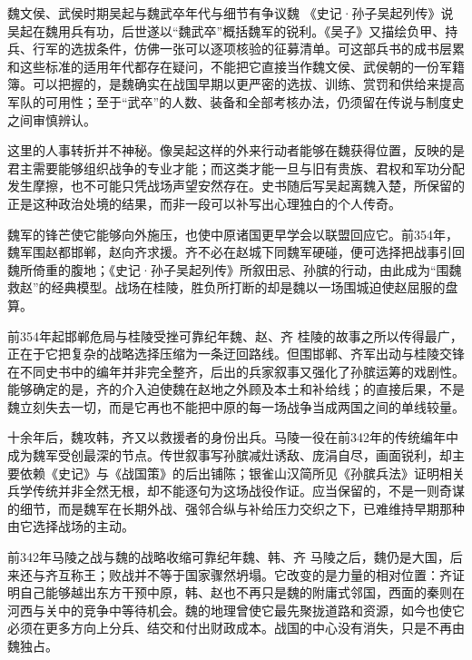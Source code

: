 \begin{event}{魏文侯、武侯时期}{吴起与魏武卒}{年代与细节有争议}{魏}
《史记·孙子吴起列传》说吴起在魏用兵有功，后世遂以“魏武卒”概括魏军的锐利。《吴子》又描绘负甲、持兵、行军的选拔条件，仿佛一张可以逐项核验的征募清单。可这部兵书的成书层累和这些标准的适用年代都存在疑问，不能把它直接当作魏文侯、武侯朝的一份军籍簿。可以把握的，是魏确实在战国早期以更严密的选拔、训练、赏罚和供给来提高军队的可用性；至于“武卒”的人数、装备和全部考核办法，仍须留在传说与制度史之间审慎辨认。

这里的人事转折并不神秘。像吴起这样的外来行动者能够在魏获得位置，反映的是君主需要能够组织战争的专业才能；而这类才能一旦与旧有贵族、君权和军功分配发生摩擦，也不可能只凭战场声望安然存在。史书随后写吴起离魏入楚，所保留的正是这种政治处境的结果，而非一段可以补写出心理独白的个人传奇。
\end{event}

魏军的锋芒使它能够向外施压，也使中原诸国更早学会以联盟回应它。前354年，魏军围赵都邯郸，赵向齐求援。齐不必在赵城下同魏军硬碰，便可选择把战事引回魏所倚重的腹地；《史记·孙子吴起列传》所叙田忌、孙膑的行动，由此成为“围魏救赵”的经典模型。战场在桂陵，胜负所打断的却是魏以一场围城迫使赵屈服的盘算。

\begin{event}{前354年起}{邯郸危局与桂陵受挫}{可靠纪年}{魏、赵、齐}
桂陵的故事之所以传得最广，正在于它把复杂的战略选择压缩为一条迂回路线。但围邯郸、齐军出动与桂陵交锋在不同史书中的编年并非完全整齐，后出的兵家叙事又强化了孙膑运筹的戏剧性。能够确定的是，齐的介入迫使魏在赵地之外顾及本土和补给线；的直接后果，不是魏立刻失去一切，而是它再也不能把中原的每一场战争当成两国之间的单线较量。
\end{event}

十余年后，魏攻韩，齐又以救援者的身份出兵。马陵一役在前342年的传统编年中成为魏军受创最深的节点。传世叙事写孙膑减灶诱敌、庞涓自尽，画面锐利，却主要依赖《史记》与《战国策》的后出铺陈；银雀山汉简所见《孙膑兵法》证明相关兵学传统并非全然无根，却不能逐句为这场战役作证。应当保留的，不是一则奇谋的细节，而是魏军在长期外战、强邻合纵与补给压力交织之下，已难维持早期那种由它选择战场的主动。

\begin{event}{前342年}{马陵之战与魏的战略收缩}{可靠纪年}{魏、韩、齐}
马陵之后，魏仍是大国，后来还与齐互称王；败战并不等于国家骤然坍塌。它改变的是力量的相对位置：齐证明自己能够越出东方干预中原，韩、赵也不再只是魏的附庸式邻国，西面的秦则在河西与关中的竞争中等待机会。魏的地理曾使它最先聚拢道路和资源，如今也使它必须在更多方向上分兵、结交和付出财政成本。战国的中心没有消失，只是不再由魏独占。
\end{event}

